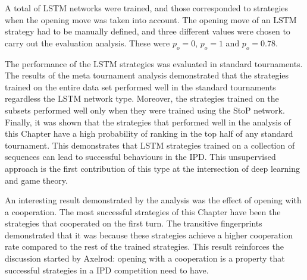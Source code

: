 A total of \lstmnetworks LSTM networks were trained, and those corresponded to
\lstmstrategies strategies when the opening move was taken into account. The
opening move of an LSTM strategy had to be manually defined, and three different
values were chosen to carry out the evaluation analysis. These were \(p_o=0\),
\(p_o=1\) and \(p_o=0.78\).

The performance of the \lstmstrategies LSTM strategies was evaluated in
\metatournamentslstm standard tournaments. The results of the meta tournament
analysis demonstrated that the strategies trained on the entire data set
performed well in the \metatournamentslstm standard tournaments regardless the
LSTM network type. Moreover, the strategies trained on the subsets
performed well only when they were trained using the StoP network. Finally, it
was shown that the strategies that performed well in the analysis of this
Chapter have a high probability of ranking in the top half of any standard
tournament. This demonstrates that LSTM strategies trained on a collection of
sequences can lead to successful behaviours in the IPD. This unsupervised approach is the 
first contribution of this 
type at the intersection of deep learning and game theory.

An interesting result demonstrated by the analysis was the effect of opening
with a cooperation. The most successful strategies of this Chapter have been the
strategies that cooperated on the first turn. The transitive
fingerprints demonstrated that it was because these strategies achieve a higher
cooperation rate compared to the rest of the trained strategies. This result
reinforces the discussion started by Axelrod: opening with a cooperation is a
property that successful strategies in a IPD competition need to have.
